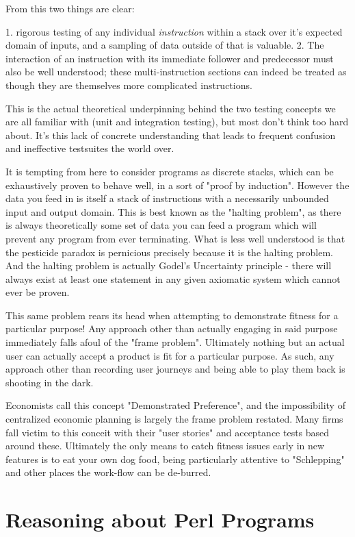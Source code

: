 \documentclass[twoside]{article}
\begin{document}
From this two things are clear:

1. rigorous testing of any individual \textit{instruction} within a stack over it's expected domain of inputs, and a sampling of data outside of that is valuable.
2. The interaction of an instruction with its immediate follower and predecessor must also be well understood; these multi-instruction sections can indeed be treated as though they are themselves more complicated instructions.

This is the actual theoretical underpinning behind the two testing concepts we are all familiar with (unit and integration testing), but most don't think too hard about.
It's this lack of concrete understanding that leads to frequent confusion and ineffective testsuites the world over.

It is tempting from here to consider programs as discrete stacks, which can be exhaustively proven to behave well, in a sort of "proof by induction".
However the data you feed in is itself a stack of instructions with a necessarily unbounded input and output domain.
This is best known as the "halting problem", as there is always theoretically some set of data you can feed a program which will prevent any program from ever terminating.
What is less well understood is that the pesticide paradox is pernicious precisely because it is the halting problem.
And the halting problem is actually Godel's Uncertainty principle - there will always exist at least one statement in any given axiomatic system which cannot ever be proven.

This same problem rears its head when attempting to demonstrate fitness for a particular purpose!
Any approach other than actually engaging in said purpose immediately falls afoul of the "frame problem".
Ultimately nothing but an actual user can actually accept a product is fit for a particular purpose.
As such, any approach other than recording user journeys and being able to play them back is shooting in the dark.

Economists call this concept "Demonstrated Preference", and the impossibility of centralized economic planning is largely the frame problem restated.
Many firms fall victim to this conceit with their "user stories" and acceptance tests based around these.
Ultimately the only means to catch fitness issues early in new features is to eat your own dog food, being particularly attentive to "Schlepping" and other places the work-flow can be de-burred.

\section{Reasoning about Perl Programs}
\end{document}
